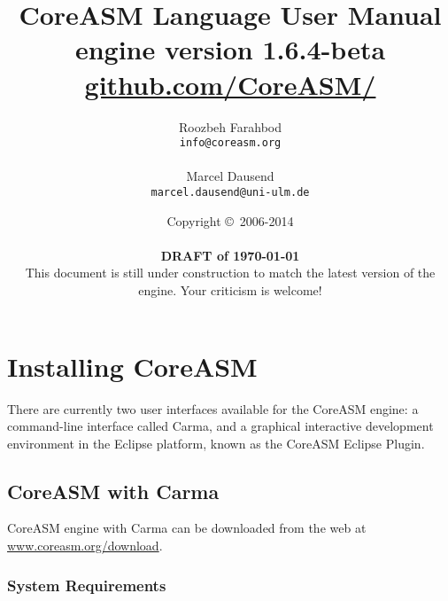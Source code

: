 \documentclass{article}
\newcommand{\version}{1.6.4-beta}
\newcommand{\CoreASM}{{\sffamily CoreASM}\xspace}
\newcommand{\Carma}{{\sffamily Carma}\xspace}
\newcommand{\copyrightNotice}[1]{{Copyright \copyright\ #1}}
\begin{document}

\title{\huge \CoreASM Language User Manual \\ {\Large engine version \version} \\ {\large \url{github.com/CoreASM/}}}

\author{Roozbeh Farahbod \\ \texttt{info@coreasm.org}\\\\Marcel Dausend \\ \texttt{marcel.dausend@uni-ulm.de}}  

\date{\copyrightNotice{2006-2014} \\~\\ {\bf DRAFT of \today} \\ {This document is still under construction to match the latest version of the engine. Your criticism is welcome!}}

 \maketitle

\newpage
\tableofcontents
\newpage


\section{Installing \CoreASM}

There are currently two user interfaces available for the \CoreASM engine: a
command-line interface called \Carma, and a graphical interactive
development environment in the Eclipse platform, known as the \CoreASM Eclipse
Plugin.


\subsection{\CoreASM with \Carma}

\CoreASM engine with \Carma can be downloaded from the web at \url{www.coreasm.org/download}.


\subsubsection{System Requirements}
\end{document}
